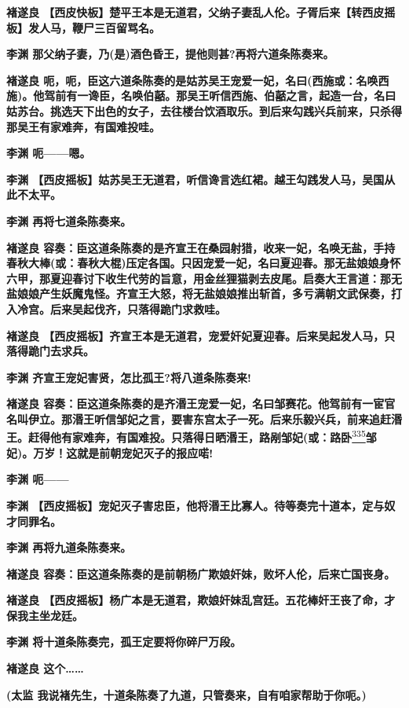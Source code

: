 \textbf{褚遂良
【西皮快板】楚平王本是无道君，父纳子妻乱人伦。子胥后来【转西皮摇板】发人马，鞭尸三百留骂名。}

\textbf{李渊 那父纳子妻，乃(是)酒色昏王，提他则甚?再将六道条陈奏来。}

\textbf{褚遂良
呃，呃，臣这六道条陈奏的是姑苏吴王宠爱一妃，名曰(西施或：名唤西施)。他驾前有一谗臣，名唤伯嚭。那吴王听信西施、伯嚭之言，起造一台，名曰姑苏台。挑选天下出色的女子，去往楼台饮酒取乐。到后来勾践兴兵前来，只杀得那吴王有家难奔，有国难投哇。}

\textbf{李渊 呃------嗯。}

\textbf{李渊
【西皮摇板】姑苏吴王无道君，听信谗言选红裙。越王勾践发人马，吴国从此不太平。}

\textbf{李渊 再将七道条陈奏来。}

\textbf{褚遂良
容奏：臣这道条陈奏的是齐宣王在桑园射猎，收来一妃，名唤无盐，手持春秋大棒(或：春秋大棍)压定各国。只因宠爱一妃，名曰夏迎春。那无盐娘娘身怀六甲，那夏迎春讨下收生代劳的旨意，用金丝狸猫剥去皮尾。启奏大王言道：那无盐娘娘产生妖魔鬼怪。齐宣王大怒，将无盐娘娘推出斩首，多亏满朝文武保奏，打入冷宫。后来吴起伐齐，只落得跪门求救哇。}

\textbf{褚遂良
【西皮摇板】齐宣王本是无道君，宠爱奸妃夏迎春。后来吴起发人马，只落得跪门去求兵。}

\textbf{李渊 齐宣王宠妃害贤，怎比孤王?将八道条陈奏来!}

\textbf{褚遂良
容奏：臣这道条陈奏的是齐湣王宠爱一妃，名曰邹赛花。他驾前有一宦官名叫伊立。那湣王听信邹妃之言，要害东宫太子一死。后来乐毅兴兵，前来追赶湣王。赶得他有家难奔，有国难投。只落得日晒湣王，路剐邹妃(或：路卧}\protect\hyperlink{fn335}{\textsuperscript{335}}\textbf{邹妃)。万岁！这就是前朝宠妃灭子的报应喏!}

\textbf{李渊 呃------}

\textbf{李渊
【西皮摇板】宠妃灭子害忠臣，他将湣王比寡人。待等奏完十道本，定与奴才同罪名。}

\textbf{李渊 再将九道条陈奏来。}

\textbf{褚遂良
容奏：臣这道条陈奏的是前朝杨广欺娘奸妹，败坏人伦，后来亡国丧身。}

\textbf{褚遂良
【西皮摇板】杨广本是无道君，欺娘奸妹乱宫廷。五花棒奸王丧了命，才保我主坐龙廷。}

\textbf{李渊 将十道条陈奏完，孤王定要将你碎尸万段。}

\textbf{褚遂良 这个\ldots{}\ldots{}}

\textbf{(太监
我说褚先生，十道条陈奏了九道，只管奏来，自有咱家帮助于你呃。)}

